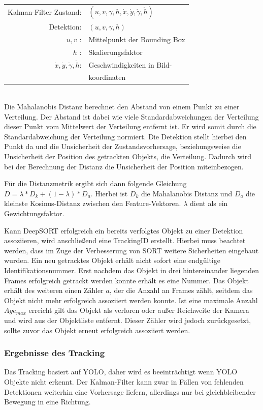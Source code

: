 \documentclass[conference]{IEEEtran}
\begin{document}
	
	\begin{tabular}{r l}
		Kalman-Filter Zustand: & $(u,v,\gamma,h,\dot{x},\dot{y},\dot{\gamma},\dot{h})$ \\
		Detektion: & $(u,v,\gamma,h)$ \\
		$u,v$ :& Mittelpunkt der Bounding Box \\
		$h$ :& Skalierungsfaktor \\
		$\dot{x},\dot{y},\dot{\gamma},\dot{h}$: & Geschwindigkeiten in Bild- \\	
		& koordinaten \\
	\end{tabular} \\
	
	Die Mahalanobis Distanz berechnet den Abstand von einem Punkt zu einer Verteilung. Der Abstand ist dabei wie viele Standardabweichungen der Verteilung dieser Punkt vom Mittelwert der Verteilung entfernt ist. Er wird somit durch die Standardabweichung der Verteilung normiert. Die Detektion stellt hierbei den Punkt da und die Unsicherheit der Zustandsvorhersage, beziehungsweise die Unsicherheit der Position des getrackten Objekts, die Verteilung. Dadurch wird bei der Berechnung der Distanz die Unsicherheit der Position miteinbezogen.
	
	Für die Distanzmetrik ergibt sich dann folgende Gleichung
	$D = \lambda * D_k + (1-\lambda) * D_a$. Hierbei ist $D_k$ die Mahalanobis Distanz und $D_a$ die kleinste Kosinus-Distanz zwischen den Feature-Vektoren. $\lambda$ dient als ein Gewichtungsfaktor.
	
	Kann DeepSORT erfolgreich ein bereits verfolgtes Objekt zu einer Detektion assoziieren, wird anschließend eine TrackingID erstellt. Hierbei muss beachtet werden, dass im Zuge der Verbesserung von SORT weitere Sicherheiten eingebaut wurden. Ein neu getracktes Objekt erhält nicht sofort eine endgültige Identifikationsnummer. Erst nachdem das Objekt in drei hintereinander liegenden Frames erfolgreich getrackt werden konnte erhält es eine Nummer. Das Objekt erhält des weiteren einen Zähler $a$, der die Anzahl an Frames zählt, seitdem das Objekt nicht mehr erfolgreich assoziiert werden konnte. Ist eine maximale Anzahl $Age_{max}$ erreicht gilt das Objekt als verloren oder außer Reichweite der Kamera und wird aus der Objektliste entfernt. Dieser Zähler wird jedoch zurückgesetzt, sollte zuvor das Objekt erneut erfolgreich assoziiert werden.
	
	\subsubsection{Ergebnisse des Tracking}
	Das Tracking basiert auf YOLO, daher wird es beeinträchtigt wenn YOLO Objekte nicht erkennt. Der Kalman-Filter kann zwar in Fällen von fehlenden Detektionen weiterhin eine Vorhersage liefern, allerdings nur bei gleichbleibender Bewegung in eine Richtung. 
	
\end{document}
